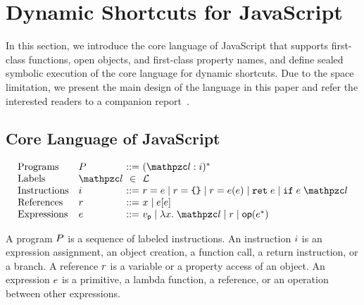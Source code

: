 \section{Dynamic Shortcuts for JavaScript}\label{sec:javascript}
In this section, we introduce the core language of JavaScript that supports
first-class functions, open objects, and first-class property names, and define
sealed symbolic execution of the core language for dynamic shortcuts.
Due to the space limitation, we present the main design of the
language in this paper and refer the interested readers to a companion report~\cite{report}.

\subsection{Core Language of JavaScript}

\[
  \begin{array}{ll@{~}c@{~}l}
    \text{Programs} & \prog &::=& (\lab: \inst)^*\\

    \text{Labels} & \lab &\in& \labset\\

    \text{Instructions} & \inst &::=&
    \refer = \expr \mid
    \refer = \kwobj \mid
    \refer = \expr ( \expr ) \mid
    \kwret \; \expr \mid
    \kwif \; \expr \; \lab\\

    \text{References} & \refer &::=&
    x \mid
    \expr [ \expr ]\\

    \text{Expressions} & \expr &::=&
    \pval \mid
    \lambda x. \; \lab \mid
    \refer \mid
    \op(\expr^*)\\
  \end{array}
\]

A program $P$ is a sequence of labeled instructions. An instruction $i$
is an expression assignment, an object creation, a function call, a return
instruction, or a branch.  A reference $r$ is a variable or a property
access of an object.  An expression $e$ is a primitive, a lambda function, a
reference, or an operation between other expressions.

